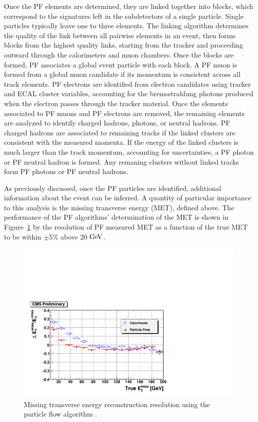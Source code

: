 \indent Once the PF elements are determined, they are linked together into blocks, which correspond to the signatures left in the subdetectors of a single particle. Single particles typically leave one to three elements. The linking algorithm determines the quality of the link between all pairwise elements in an event, then forms blocks from the highest quality links, starting from the tracker and proceeding outward through the calorimeters and muon chambers. Once the blocks are formed, PF associates a global event particle with each block. A PF muon is formed from a global muon candidate if its momentum is consistent across all track elements. PF electrons are identified from electron candidates using tracker and ECAL cluster variables, accounting for the bremsstrahlung photons produced when the electron passes through the tracker material. Once the elements associated to PF muons and PF electrons are removed, the remaining elements are analyzed to identify charged hadrons, photons, or neutral hadrons. PF charged hadrons are associated to remaining tracks if the linked clusters are consistent with the measured momenta. If the energy of the linked clusters is much larger than the track momentum, accounting for uncertainties, a PF photon or PF neutral hadron is formed. Any remaning clusters without linked tracks form PF photons or PF neutral hadrons. 

\indent As previously discussed, once the PF particles are identified, additional information about the event can be inferred. A quantity of particular importance to this analysis is the missing transverse energy (MET), defined above. The performance of the PF algorithms' determination of the MET is shown in Figure~\ref{fig:pfmetres} by the resolution of PF measured MET as a function of the true MET to be within $\pm5\%$ above 20 $\mathrm{Ge\kern -0.1em V}$.


\begin{figure}[tbh]
\centering
\includegraphics[width=4.5in]{figures/pfmetres.pdf}
\caption{Missing transverse energy reconstruction resolution using the particle flow algorithm \cite{CMS:2009nxa}.}
\label{fig:pfmetres}
\end{figure}

